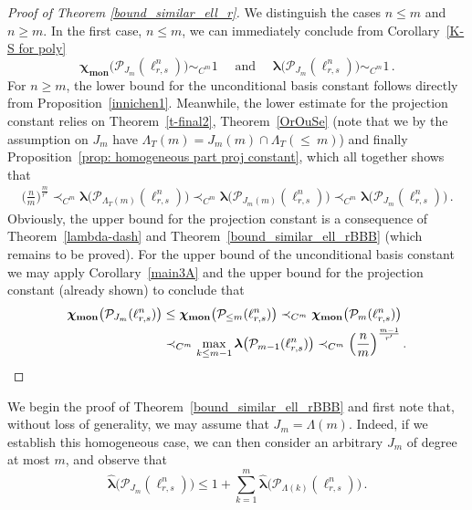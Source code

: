 \documentclass[12pt]{amsart}
\numberwithin{subsection}{section}
\theoremstyle{definition}
\theoremstyle{remark}
\DeclareMathOperator{\mon}{mon}
\newcommand{\chimon}{\chi_{\mon}}
\begin{document}
\begin{proof}[Proof of Theorem \ref{bound_similar_ell_r}]
We distinguish the cases $n \le m$ and $n \ge m$. In the first case, $n \le m$, we can immediately conclude from Corollary~\ref{K-S for poly}
\[
\boldsymbol{\chimon}\big(\mathcal P_{J_m}( \ell_{r,s}^n)\big)  \sim_{C^m} 1
\quad\textrm{ and }\quad  \boldsymbol{\lambda}\big(\mathcal P_{J_m}(\ell_{r,s}^n)\big)  \sim_{C^m} 1\,.
\]
For $n \ge m$, the lower bound for the unconditional basis constant follows directly from Proposition~\ref{innichen1}. Meanwhile,
the lower estimate for the projection constant relies on Theorem~\ref{t-final2}, Theorem~\ref{OrOuSe}
(note that we by the assumption on $J_m$ have 
$\Lambda_T(m) =J_m(m)\cap \Lambda_T(\leq\ m)$)
and finally Proposition~\ref{prop: homogeneous part proj constant}, which all together  shows that
\begin{align*}
\Big(\frac{n}{m}\Big)^{\frac{m}{r'}}
\prec_{C^m}\boldsymbol{\lambda}\big(\mathcal{P}_{\Lambda_T(m)}(\ell_{r,s}^n)\big)
\prec_{C^m}
\boldsymbol{\lambda}\big(\mathcal{P}_{J_m(m) }(\ell_{r,s}^n)\big)
\prec_{C^m}\boldsymbol{\lambda}\big(\mathcal{P}_{J_m}(\ell_{r,s}^n)\big)\,.
\end{align*}
Obviously, the   upper bound for the projection constant is a consequence of  Theorem~\ref{lambda-dash}
and Theorem~\ref{bound_similar_ell_rBBB} (which  remains to be proved).
For the upper bound of the unconditional basis constant we may apply Corollary~\ref{main3A}
and the upper bound for the projection constant (already shown) to  conclude that
\begin{align*}
\boldsymbol{\chimon}\big(\mathcal{P}_{J_m}(\ell_{r,s}^n)\big)
& \le \boldsymbol{\chimon}\big(\mathcal{P}_{\leq m}(\ell_{r,s}^n)\big)
\prec_{C^m}  \boldsymbol{\chimon}\big(\mathcal{P}_{m}(\ell_{r,s}^n)\big)
\\
& \prec_{C^m} \max_{k \leq m-1} \boldsymbol{\lambda}\big(\mathcal{P}_{m-1}(\ell_{r,s}^n)\big)
\prec_{C^m}  \Big(\frac{n}{m}\Big)^{\frac{m-1}{r'}}\,. \qedhere
\end{align*}
\end{proof}
We begin the proof of Theorem~\ref{bound_similar_ell_rBBB} and first note that, without loss of generality, we may assume
that $J_m = \Lambda(m)$. Indeed, if we establish this homogeneous case, we can then consider an arbitrary $J_m$ of degree
at most $m$, and observe that
\begin{equation}\label{red1}
\widehat{\boldsymbol{\lambda}}\big(\mathcal P_{J_m}(\ell_{r,s}^n)\big)
\leq 1 +\sum_{k=1}^{m} \widehat{\boldsymbol{\lambda}}\big(\mathcal P_{\Lambda(k)}(\ell_{r,s}^n)\big)\,.
\end{equation}
\end{document}
